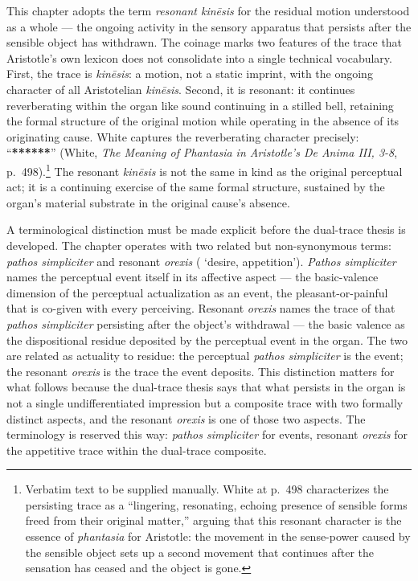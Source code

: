 This chapter adopts the term \textit{resonant kinēsis} for the residual motion understood as a whole --- the ongoing activity in the sensory apparatus that persists after the sensible object has withdrawn. The coinage marks two features of the trace that Aristotle's own lexicon does not consolidate into a single technical vocabulary. First, the trace is \textit{kinēsis}: a motion, not a static imprint, with the ongoing character of all Aristotelian \textit{kinēsis}. Second, it is resonant: it continues reverberating within the organ like sound continuing in a stilled bell, retaining the formal structure of the original motion while operating in the absence of its originating cause. White captures the reverberating character precisely: ``\textbf{******}'' (White, \textit{The Meaning of Phantasia in Aristotle's De Anima III, 3-8}, p.~498).\footnote{Verbatim text to be supplied manually. White at p.~498 characterizes the persisting trace as a ``lingering, resonating, echoing presence of sensible forms freed from their original matter,'' arguing that this resonant character is the essence of \textit{phantasia} for Aristotle: the movement in the sense-power caused by the sensible object sets up a second movement that continues after the sensation has ceased and the object is gone.} The resonant \textit{kinēsis} is not the same in kind as the original perceptual act; it is a continuing exercise of the same formal structure, sustained by the organ's material substrate in the original cause's absence.

A terminological distinction must be made explicit before the dual-trace thesis is developed. The chapter operates with two related but non-synonymous terms: \textit{pathos simpliciter} and resonant \textit{orexis} ( `desire, appetition'). \textit{Pathos simpliciter} names the perceptual event itself in its affective aspect --- the basic-valence dimension of the perceptual actualization as an event, the pleasant-or-painful that is co-given with every perceiving. Resonant \textit{orexis} names the trace of that \textit{pathos simpliciter} persisting after the object's withdrawal --- the basic valence as the dispositional residue deposited by the perceptual event in the organ. The two are related as actuality to residue: the perceptual \textit{pathos simpliciter} is the event; the resonant \textit{orexis} is the trace the event deposits. This distinction matters for what follows because the dual-trace thesis says that what persists in the organ is not a single undifferentiated impression but a composite trace with two formally distinct aspects, and the resonant \textit{orexis} is one of those two aspects. The terminology is reserved this way: \textit{pathos simpliciter} for events, resonant \textit{orexis} for the appetitive trace within the dual-trace composite.

